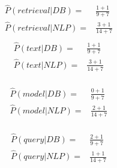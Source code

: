 \documentclass{article}
\begin{document}
    \section{}
    \begin{equation}
        \begin{split}
            \hat{P}(retrieval|DB)=&\frac{1+1}{9+7}\\
            \hat{P}(retrieval|NLP)=&\frac{3+1}{14+7}\\
        \end{split}
    \end{equation}
    \begin{equation}
        \begin{split}
            \hat{P}(text|DB)=&\frac{1+1}{9+7}\\
            \hat{P}(text|NLP)=&\frac{3+1}{14+7}\\
        \end{split}
    \end{equation}

    \begin{equation}
        \begin{split}
            \hat{P}(model|DB)=&\frac{0+1}{9+7}\\
            \hat{P}(model|NLP)=&\frac{2+1}{14+7}\\
        \end{split}
    \end{equation}

    \begin{equation}
        \begin{split}
            \hat{P}(query|DB)=&\frac{2+1}{9+7}\\
            \hat{P}(query|NLP)=&\frac{1+1}{14+7}\\
        \end{split}
    \end{equation}
\end{document}
